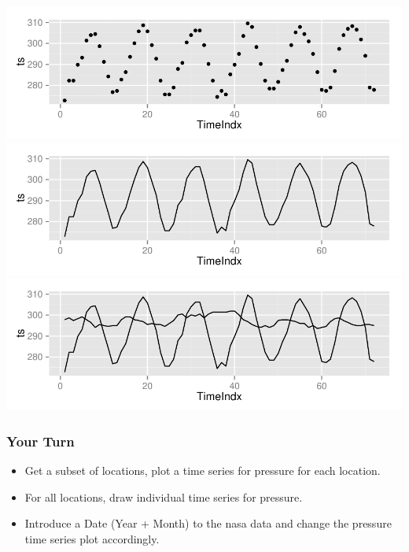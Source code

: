 \documentclass{beamer}\usepackage[]{graphicx}\usepackage[]{color}
\begin{document}
\begin{frame}[fragile]
\begin{minipage}{.55\linewidth}
\includegraphics[width=\linewidth]{figure/tsplot1}\\
\includegraphics[width=\linewidth]{figure/tsplot2}\\
\includegraphics[width=\linewidth]{figure/tsplot3}
\end{minipage}
\end{frame}

\begin{frame}
\frametitle{Your Turn}
\begin{itemize}
\item Get a subset of locations, plot a time series for pressure for each location. \\\medskip
\item For all locations, draw individual time series for pressure.\\\medskip
\item Introduce a Date (Year + Month) to the nasa data and change the pressure time series plot accordingly.
\end{itemize}
\end{frame}
\end{document}
